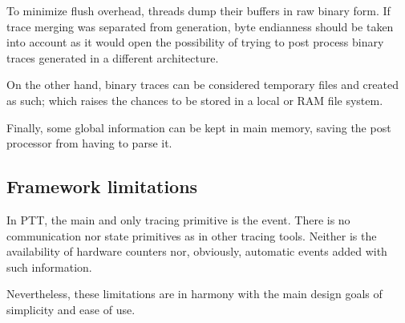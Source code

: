 To minimize flush overhead, threads dump their buffers in raw binary form.  If
trace merging was separated from generation, byte endianness should be taken
into account as it would open the possibility of trying to post process binary
traces generated in a different architecture.

On the other hand, binary traces can be considered temporary files and created
as such; which raises the chances to be stored in a local or RAM file system.

Finally, some global information can be kept in main memory, saving the post
processor from having to parse it.


\subsection{Framework limitations}

In PTT, the main and only tracing primitive is the event.  There is no
communication nor state primitives as in other tracing tools.  Neither is the
availability of hardware counters nor, obviously, automatic events added with
such information.

Nevertheless, these limitations are in harmony with the main design goals of
simplicity and ease of use.


